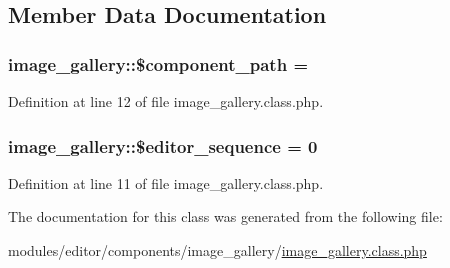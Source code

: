 \subsection{Member Data Documentation}
\subsubsection[{\texorpdfstring{\$component\+\_\+path}{$component_path}}]{\setlength{\rightskip}{0pt plus 5cm}image\+\_\+gallery\+::\$component\+\_\+path = \textquotesingle{}\textquotesingle{}}\hypertarget{classimage__gallery_a1ace79c095079e133d5f98625d89460e}{}\label{classimage__gallery_a1ace79c095079e133d5f98625d89460e}


Definition at line 12 of file image\+\_\+gallery.\+class.\+php.

\subsubsection[{\texorpdfstring{\$editor\+\_\+sequence}{$editor_sequence}}]{\setlength{\rightskip}{0pt plus 5cm}image\+\_\+gallery\+::\$editor\+\_\+sequence = 0}\hypertarget{classimage__gallery_a63124b017697df694664efada4edd0be}{}\label{classimage__gallery_a63124b017697df694664efada4edd0be}


Definition at line 11 of file image\+\_\+gallery.\+class.\+php.



The documentation for this class was generated from the following file\+:\begin{DoxyCompactItemize}
\item 
modules/editor/components/image\+\_\+gallery/\hyperlink{image__gallery_8class_8php}{image\+\_\+gallery.\+class.\+php}\end{DoxyCompactItemize}
